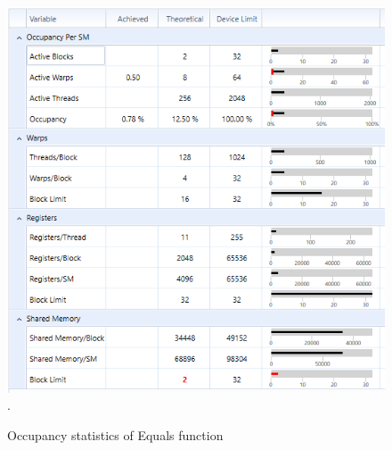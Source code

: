 \documentclass[oneside,openright,12pt,final,en]{mgr}
\begin{document}
\begin{figure}[H]
	\centering
	\includegraphics[width=\textwidth]{equals_occupancy}.
	\caption{Occupancy statistics of Equals function}
	\label{fig:equals_occupancy}
\end{figure}
\end{document}
